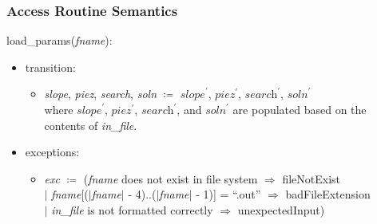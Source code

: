 \documentclass[12pt, titlepage]{article}
\begin{document}
\subsubsection{Access Routine Semantics}

load\_params(\textit{fname}):
\begin{itemize}
	\item transition:
	\begin{itemize}
		\item[] \textit{slope}, \textit{piez}, 
		\textit{search}, 
		\textit{soln} $\coloneqq$  $\textit{slope}^\prime$, 
		$\textit{piez}^\prime$, $\textit{search}^\prime$, 
		$\textit{soln}^\prime$\\ 
		where $\textit{slope}^\prime$, 
		$\textit{piez}^\prime$, $\textit{search}^\prime$, and 
		$\textit{soln}^\prime$
		are populated based on the contents of \textit{in\_file}.
	\end{itemize}

	\item exceptions:
	\begin{itemize}
		\item[] \textit{exc} $\coloneqq$ (\textit{fname} does not exist in file 
		system $\Rightarrow$ fileNotExist\\
		$|$ \textit{fname}[($|$\textit{fname}$|$ - 4)..($|$\textit{fname}$|$ - 
		1)] = ``.out'' $\Rightarrow$ badFileExtension\\
		$|$ \textit{in\_file} is not formatted correctly $\Rightarrow$ 
		unexpectedInput)
	\end{itemize}
\end{itemize}
\end{document}
